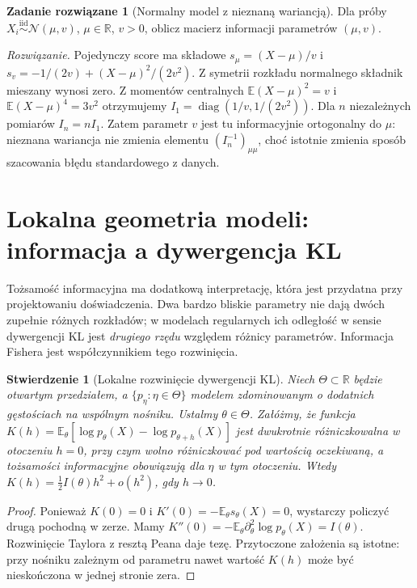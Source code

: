 \documentclass[11pt,a4paper,oneside]{report}
\numberwithin{equation}{chapter}
\theoremstyle{plain}
\newtheorem{stwierdzenie}[twierdzenie]{Stwierdzenie}
\theoremstyle{definition}
\newtheorem{zadanie}{Zadanie rozwiązane}[chapter]
\theoremstyle{remark}
\newcommand{\R}{\mathbb R}
\newcommand{\E}{\mathbb E}
\newcommand{\Normal}{\mathcal N}
\newcommand{\iid}{\mathrel{\overset{\mathrm{iid}}\sim}}
\DeclareMathOperator{\diag}{diag}
\begin{document}
\begin{zadanie}[Normalny model z nieznaną wariancją]
Dla próby $X_i\iid\Normal(\mu,v)$, $\mu\in\R$, $v>0$,
oblicz macierz informacji parametrów $(\mu,v)$.
\par\emph{Rozwiązanie.} Pojedynczy score ma składowe
$s_\mu=(X-\mu)/v$ i
$s_v=-1/(2v)+(X-\mu)^2/(2v^2)$.
Z symetrii rozkładu normalnego składnik mieszany wynosi zero.
Z momentów centralnych $\E(X-\mu)^2=v$ i
$\E(X-\mu)^4=3v^2$ otrzymujemy
$I_1=\diag(1/v,1/(2v^2))$.
Dla $n$ niezależnych pomiarów $I_n=nI_1$.
Zatem parametr $v$ jest tu informacyjnie ortogonalny do $\mu$:
nieznana wariancja nie zmienia elementu $(I_n^{-1})_{\mu\mu}$,
choć istotnie zmienia sposób szacowania błędu standardowego z danych.
\end{zadanie}


\section{Lokalna geometria modeli: informacja a dywergencja KL}
Tożsamość informacyjna ma dodatkową interpretację, która jest
przydatna przy projektowaniu doświadczenia. Dwa bardzo bliskie
parametry nie dają dwóch zupełnie różnych rozkładów; w modelach
regularnych ich odległość w sensie dywergencji KL jest
\emph{drugiego rzędu} względem różnicy parametrów. Informacja
Fishera jest współczynnikiem tego rozwinięcia.

\begin{stwierdzenie}[Lokalne rozwinięcie dywergencji KL]
\label{prop:kl-fisher-expansion}
Niech $\Theta\subset\R$ będzie otwartym przedziałem, a
$\{p_\eta:\eta\in\Theta\}$ modelem zdominowanym o dodatnich
gęstościach na wspólnym nośniku. Ustalmy $\theta\in\Theta$.
Załóżmy, że funkcja
$K(h)=\E_\theta[\log p_\theta(X)-\log p_{\theta+h}(X)]$
jest dwukrotnie różniczkowalna w otoczeniu $h=0$, przy czym
wolno różniczkować pod wartością oczekiwaną, a tożsamości
informacyjne obowiązują dla $\eta$ w tym otoczeniu.
Wtedy
$K(h)=\tfrac12 I(\theta)h^2+o(h^2)$, gdy $h\to0$.
\end{stwierdzenie}
\begin{proof}
Ponieważ $K(0)=0$ i $K'(0)=-\E_\theta s_\theta(X)=0$,
wystarczy policzyć drugą pochodną w zerze.
Mamy $K''(0)=-\E_\theta\partial_\theta^2\log p_\theta(X)
=I(\theta)$. Rozwinięcie Taylora z resztą Peana daje tezę.
Przytoczone założenia są istotne: przy nośniku zależnym od
parametru nawet wartość $K(h)$ może być nieskończona w jednej
stronie zera.
\end{proof}
\end{document}
